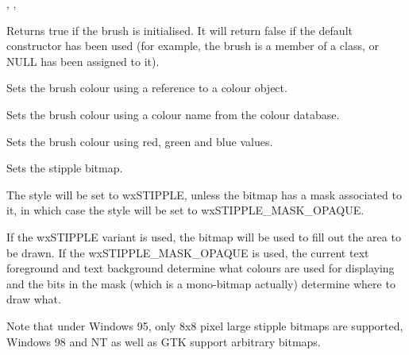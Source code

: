 
, ,\rtfsp
{}

\label{wxbrushok}


Returns true if the brush is initialised. It will return false if the default
constructor has been used (for example, the brush is a member of a class, or
NULL has been assigned to it).

\label{wxbrushsetcolour}


Sets the brush colour using a reference to a colour object.


Sets the brush colour using a colour name from the colour database.


Sets the brush colour using red, green and blue values.



\label{wxbrushsetstipple}


Sets the stipple bitmap.




The style will be set to wxSTIPPLE, unless the bitmap has a mask associated
to it, in which case the style will be set to wxSTIPPLE\_MASK\_OPAQUE.

If the wxSTIPPLE variant is used, the bitmap will be used to fill out the
area to be drawn. If the wxSTIPPLE\_MASK\_OPAQUE is used, the current
text foreground and text background determine what colours are used for
displaying and the bits in the mask (which is a mono-bitmap actually)
determine where to draw what.

Note that under Windows 95, only 8x8 pixel large stipple bitmaps are
supported, Windows 98 and NT as well as GTK support arbitrary bitmaps.

